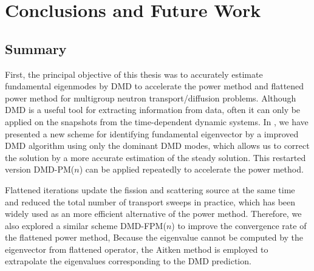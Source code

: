
\cleardoublepage


\chapter{Conclusions and Future Work}
\label{chapter:conclusion}
\section{Summary}
First, the principal objective of this thesis was to accurately estimate fundamental eigenmodes by DMD to accelerate the power method and flattened power method for multigroup neutron transport/diffusion problems.
Although DMD is a useful tool for extracting information from data, often it can only be applied on the snapshots from the time-dependent dynamic systems.
In , we have presented a new scheme for identifying fundamental eigenvector by a improved DMD algorithm using only the dominant DMD modes, which allows us to correct the solution by a more accurate estimation of the steady solution. 
This restarted version DMD-PM($n$) can be applied repeatedly to accelerate the power method.

Flattened iterations update the fission and scattering source at the same time and reduced the total number of transport sweeps in practice, which has been widely used as an  more efficient alternative of the power method.
Therefore, we also explored a similar scheme DMD-FPM($n$) to improve the convergence rate of the flattened power method, 
Because the eigenvalue cannot be computed by the eigenvector from flattened operator, the Aitken method is employed to extrapolate the eigenvalues corresponding to the DMD prediction.

